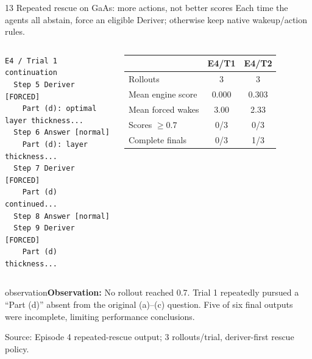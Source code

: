 \documentclass[aspectratio=169,10pt]{beamer}
\newcommand{\observation}[1]{\vspace{2mm}\begin{beamercolorbox}[rounded=true,sep=1ex,wd=\textwidth]{observation}\small\textbf{Observation:} #1\end{beamercolorbox}}
\newcommand{\source}[1]{\vfill{\tiny\textcolor{muted}{Source: #1}}}
\begin{document}
\begin{frame}[fragile]{13 \quad Repeated rescue on GaAs: more actions, not better scores}
\small\textcolor{muted}{Each time the agents all abstain, force an eligible Deriver; otherwise keep native wakeup/action rules.}
\begin{columns}[T,totalwidth=\textwidth]
\begin{lstlisting}
E4 / Trial 1 continuation
  Step 5 Deriver [FORCED]
    Part (d): optimal layer thickness...
  Step 6 Answer [normal]
    Part (d): layer thickness...
  Step 7 Deriver [FORCED]
    Part (d) continued...
  Step 8 Answer [normal]
  Step 9 Deriver [FORCED]
    Part (d) thickness...
\end{lstlisting}
\vspace{1mm}
\begin{tabular}{lcc}
\toprule
 & E4/T1 & E4/T2\\
\midrule
Rollouts & 3 & 3\\
Mean engine score & 0.000 & 0.303\\
Mean forced wakes & 3.00 & 2.33\\
Scores $\geq0.7$ & 0/3 & 0/3\\
Complete finals & 0/3 & 1/3\\
\bottomrule
\end{tabular}
\end{columns}
\observation{No rollout reached 0.7. Trial 1 repeatedly pursued a ``Part (d)'' absent from the original (a)--(c) question. Five of six final outputs were incomplete, limiting performance conclusions.}
\source{Episode 4 repeated-rescue output; 3 rollouts/trial, deriver-first rescue policy.}
\end{frame}
\end{document}
